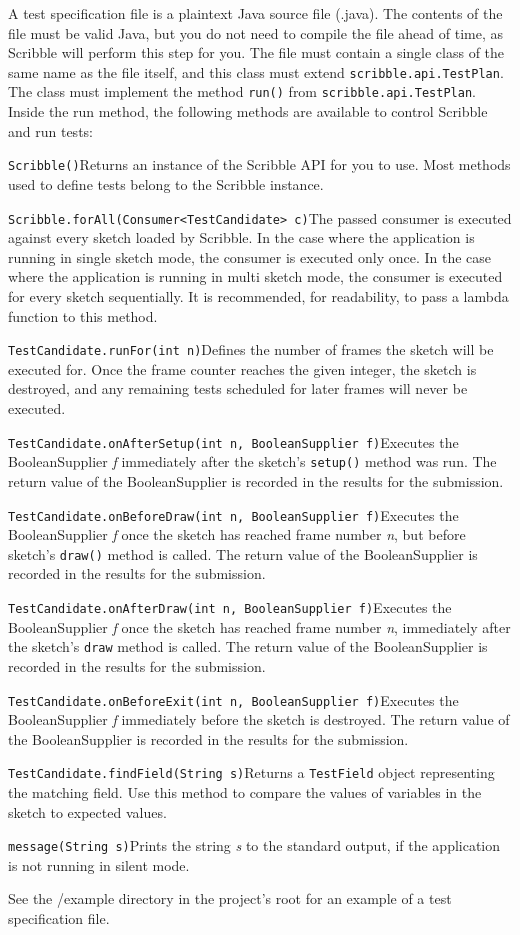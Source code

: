 \documentclass[11pt, a4paper, onecolumn, portrait]{article}
\begin{document}
A test specification file is a plaintext Java source file (.java). The contents of the file must be valid Java, but you do not need to compile the file ahead of time, as Scribble will perform this step for you. The file must contain a single class of the same name as the file itself, and this class must extend \verb|scribble.api.TestPlan|.  The class must implement the method \verb|run()| from \verb|scribble.api.TestPlan|. Inside the run method, the following methods are available to control Scribble and run tests:

\begin{description}
\item{\verb|Scribble()|}\quad Returns an instance of the Scribble API for you to use. Most methods used to define tests belong to the Scribble instance.
\item{\verb|Scribble.forAll(Consumer<TestCandidate> c)|}\quad The passed consumer is executed against every sketch loaded by Scribble. In the case where the application is running in single sketch mode, the consumer is executed only once. In the case where the application is running in multi sketch mode, the consumer is executed for every sketch sequentially. It is recommended, for readability, to pass a lambda function to this method. 
\item{\verb|TestCandidate.runFor(int n)|}\quad Defines the number of frames the sketch will be executed for. Once the frame counter reaches the given integer, the sketch is destroyed, and any remaining tests scheduled for later frames will never be executed.
\item{\verb|TestCandidate.onAfterSetup(int n, BooleanSupplier f)|}\quad Executes the BooleanSupplier \emph{f} immediately after the sketch's \verb|setup()| method was run. The return value of the BooleanSupplier is recorded in the results for the submission.
\item{\verb|TestCandidate.onBeforeDraw(int n, BooleanSupplier f)|}\quad Executes the BooleanSupplier \emph{f} once the sketch has reached frame number \emph{n}, but before sketch's \verb|draw()| method is called.  The return value of the BooleanSupplier is recorded in the results for the submission.
\item{\verb|TestCandidate.onAfterDraw(int n, BooleanSupplier f)|}\quad Executes the BooleanSupplier \emph{f} once the sketch has reached frame number \emph{n}, immediately after the sketch's \verb|draw| method is called. The return value of the BooleanSupplier is recorded in the results for the submission.
\item{\verb|TestCandidate.onBeforeExit(int n, BooleanSupplier f)|}\quad Executes the BooleanSupplier \emph{f} immediately before the sketch is destroyed.  The return value of the BooleanSupplier is recorded in the results for the submission.
\item{\verb|TestCandidate.findField(String s)|}\quad Returns a \verb|TestField| object representing the matching field. Use this method to compare the values of variables in the sketch to expected values.
\item{\verb|message(String s)|}\quad Prints the string \emph{s} to the standard output, if the application is not running in silent mode. 
\end{description}

See the /example directory in the project's root for an example of a test specification file. 
\end{document}
